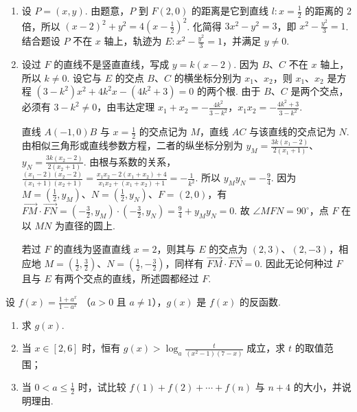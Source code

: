 \begin{solution}
\begin{enumerate}
\item 设 \(P=(x,y)\). 由题意，\(P\) 到 \(F(2,0)\) 的距离是它到直线 \(l:x=\frac12\) 的距离的 \(2\) 倍，所以
\((x-2)^2+y^2=4\left(x-\frac12\right)^2\).
化简得 \(3x^2-y^2=3\)，即 \(x^2-\frac{y^2}{3}=1\). 结合题设 \(P\) 不在 \(x\) 轴上，轨迹为 \(E: x^2-\frac{y^2}{3}=1\)，并满足 \(y\ne0\).
\item 设过 \(F\) 的直线不是竖直直线，写成 \(y=k(x-2)\). 因为 \(B\)、\(C\) 不在 \(x\) 轴上，所以 \(k\ne0\). 设它与 \(E\) 的交点 \(B\)、\(C\) 的横坐标分别为 \(x_1\)、\(x_2\)，则 \(x_1\)、\(x_2\) 是方程
\((3-k^2)x^2+4k^2x-(4k^2+3)=0\)
的两个根. 由于 \(B\)、\(C\) 是两个交点，必须有 \(3-k^2\ne0\)，由韦达定理
\(x_1+x_2=-\frac{4k^2}{3-k^2}\)，\(x_1x_2=-\frac{4k^2+3}{3-k^2}\).

直线 \(A(-1,0)B\) 与 \(x=\frac12\) 的交点记为 \(M\)，直线 \(A C\) 与该直线的交点记为 \(N\). 由相似三角形或直线参数方程，二者的纵坐标分别为
\(y_M=\frac{3k(x_1-2)}{2(x_1+1)}\)、\(y_N=\frac{3k(x_2-2)}{2(x_2+1)}\).
由根与系数的关系，
\(\frac{(x_1-2)(x_2-2)}{(x_1+1)(x_2+1)}
=\frac{x_1x_2-2(x_1+x_2)+4}{x_1x_2+(x_1+x_2)+1}=-\frac1{k^2}\).
所以 \(y_My_N=-\frac94\). 因为 \(M=(\frac12,y_M)\)、\(N=(\frac12,y_N)\)、\(F=(2,0)\)，有
\(\overrightarrow{FM}\cdot\overrightarrow{FN}=\left(-\frac32,y_M\right)\cdot\left(-\frac32,y_N\right)=\frac94+y_My_N=0\).
故 \(\angle MFN=90^\circ\)，点 \(F\) 在以 \(MN\) 为直径的圆上.

若过 \(F\) 的直线为竖直直线 \(x=2\)，则其与 \(E\) 的交点为 \((2,3)\)、\((2,-3)\)，相应地 \(M=(\frac12,\frac32)\)、\(N=(\frac12,-\frac32)\)，同样有 \(\overrightarrow{FM}\cdot\overrightarrow{FN}=0\). 因此无论何种过 \(F\) 且与 \(E\) 有两个交点的直线，所述圆都经过 \(F\).
\end{enumerate}
\end{solution}

\begin{problem}
设 \( f(x) = \frac{1 + a^x}{1 - a^x} \) （\(a > 0\) 且 \(a \neq 1\)），\( g(x) \) 是 \( f(x) \) 的反函数.

\begin{enumerate}
\item 求 \( g(x) \).
\item 当 \(x \in [2,6]\) 时，恒有 \(g(x) > \log_a \frac{t}{(x^2 - 1)(7 - x)}\) 成立，求 \(t\) 的取值范围；
\item 当 \(0 < a \leqslant \frac{1}{2}\) 时，试比较 \(f(1) + f(2) + \cdots + f(n)\) 与 \(n + 4\) 的大小，并说明理由.
\end{enumerate}
\end{problem}

